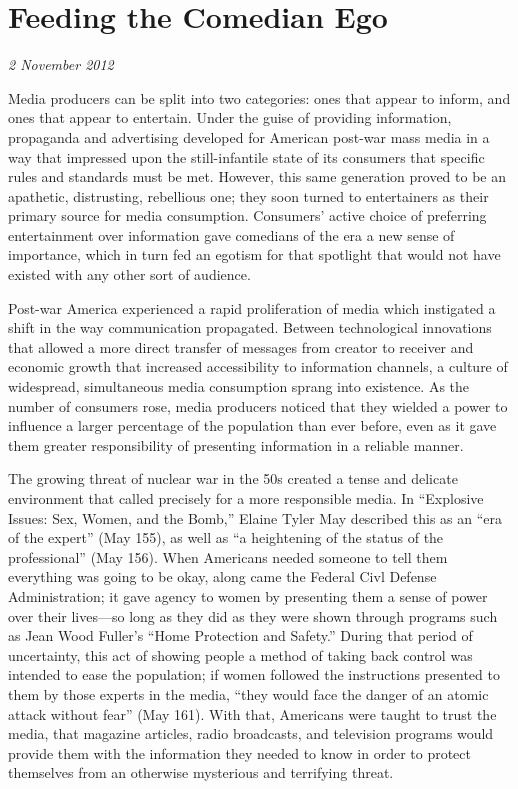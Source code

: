 \section{Feeding the Comedian Ego}

\textit{2 November 2012}

Media producers can be split into two categories: ones that appear to inform,
and ones that appear to entertain. Under the guise of providing information,
propaganda and advertising developed for American post-war mass media in a way
that impressed upon the still-infantile state of its consumers that specific
rules and standards must be met. However, this same generation proved to be an
apathetic, distrusting, rebellious one; they soon turned to entertainers as
their primary source for media consumption. Consumers' active choice of
preferring entertainment over information gave comedians of the era a new sense
of importance, which in turn fed an egotism for that spotlight that would not
have existed with any other sort of audience.

Post-war America experienced a rapid proliferation of media which instigated a
shift in the way communication propagated. Between technological innovations
that allowed a more direct transfer of messages from creator to receiver and
economic growth that increased accessibility to information channels, a culture
of widespread, simultaneous media consumption sprang into existence. As the
number of consumers rose, media producers noticed that they wielded a power to
influence a larger percentage of the population than ever before, even as it
gave them greater responsibility of presenting information in a reliable manner.

The growing threat of nuclear war in the 50s created a tense and delicate
environment that called precisely for a more responsible media. In ``Explosive
Issues: Sex, Women, and the Bomb,'' Elaine Tyler May described this as an ``era of
the expert'' (May 155), as well as ``a heightening of the status of the
professional'' (May 156). When Americans needed someone to tell them everything
was going to be okay, along came the Federal Civl Defense Administration; it
gave agency to women by presenting them a sense of power over their lives—so
long as they did as they were shown through programs such as Jean Wood Fuller's
``Home Protection and Safety.'' During that period of uncertainty, this act of
showing people a method of taking back control was intended to ease the
population; if women followed the instructions presented to them by those
experts in the media, ``they would face the danger of an atomic attack without
fear'' (May 161).  With that, Americans were taught to trust the media, that
magazine articles, radio broadcasts, and television programs would provide them
with the information they needed to know in order to protect themselves from an
otherwise mysterious and terrifying threat.


